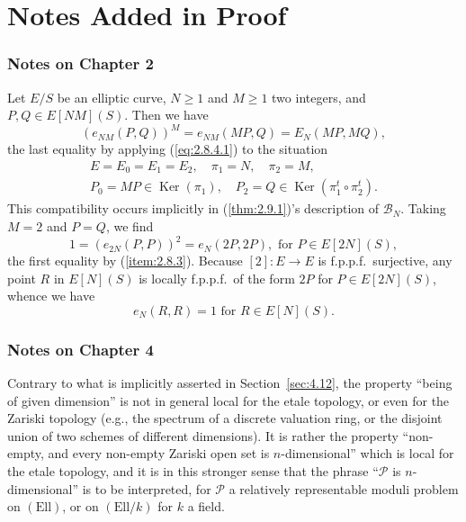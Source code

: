 
\chapter*{Notes Added in Proof}

\subsection*{Notes on Chapter 2}

Let $E/S$ be an elliptic curve, $N \ge 1$ and $M \ge 1$ two integers, and $P,Q \in E[NM](S)$. Then we have
\[
(e_{NM}(P,Q))^M = e_{NM}(MP,Q) = E_N(MP,MQ) ,
\]
the last equality by applying (\ref{eq:2.8.4.1}) to the situation
\begin{gather*}
E = E_0 = E_1 = E_2,\quad \pi_1 = N,\quad \pi_2 = M, \\
P_0 = MP \in \operatorname{Ker}(\pi_1),\quad P_2 = Q \in \operatorname{Ker}(\pi_1^t \circ \pi_2^t) .
\end{gather*}
This compatibility occurs implicitly in (\ref{thm:2.9.1})'s description of $\mathcal{B}_N$.
Taking $M = 2$ and $P = Q$, we find
\[
1 = (e_{2N}(P,P))^2 = e_N(2P,2P), \text{ for } P \in E[2N](S) ,
\]
the first equality by (\ref{item:2.8.3}). Because $[2]: E \to E$ is f.p.p.f.\ surjective, any point $R$ in $E[N](S)$ is locally f.p.p.f.\ of the form $2P$ for $P \in E[2N](S)$, whence we have
\[
e_N(R,R) = 1 \text{ for } R \in E[N](S) .
\]

\subsection*{Notes on Chapter 4}

Contrary to what is implicitly asserted in Section~\ref{sec:4.12}, the property ``being of given dimension'' is not in general local for the etale topology, or even for the Zariski topology (e.g., the spectrum of a discrete valuation ring, or the disjoint union of two schemes of different dimensions). It is rather the property ``non-empty, and every non-empty Zariski open set is $n$-dimensional'' which is local for the etale topology, and it is in this stronger sense that the phrase ``$\mathcal{P}$ is $n$-dimensional'' is to be interpreted, for $\mathcal{P}$ a relatively representable moduli problem on $(\mathrm{Ell})$, or on $(\mathrm{Ell}/k)$ for $k$ a field.

